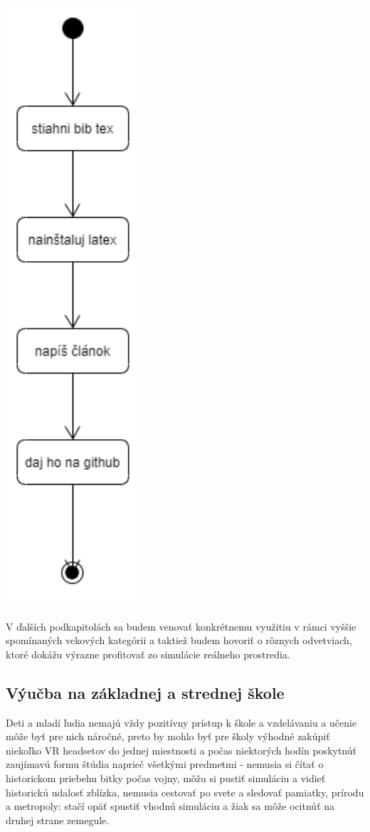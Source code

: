 \documentclass[10pt,twoside,slovak,a4paper]{article}
\begin{document}
\includegraphics[scale = 0.5]{diagram}

 V ďalších podkapitolách sa budem venovať konkrétnemu využitiu v rámci vyššie spomínaných vekových kategórii a taktiež budem hovoriť o rôznych odvetviach, ktoré dokážu výrazne profitovať zo simulácie reálneho prostredia.

\subsection{Výučba na základnej a strednej škole} \label{deti}
Deti a mladí ľudia nemajú vždy pozitívny prístup k škole a vzdelávaniu a učenie môže byť pre nich náročné, preto by mohlo byť pre školy výhodné zakúpiť niekoľko VR headsetov do jednej miestnosti a počas niektorých hodín poskytnúť zaujímavú formu štúdia naprieč všetkými predmetmi - nemusia si čítať o historickom priebehu bitky počas vojny, môžu si pustiť simuláciu a vidieť historickú udalosť zblízka, nemusia cestovať po svete a sledovať pamiatky, prírodu a metropoly: stačí opäť spustiť vhodnú simuláciu a žiak sa môže ocitnúť na druhej strane zemegule.
\end{document}
